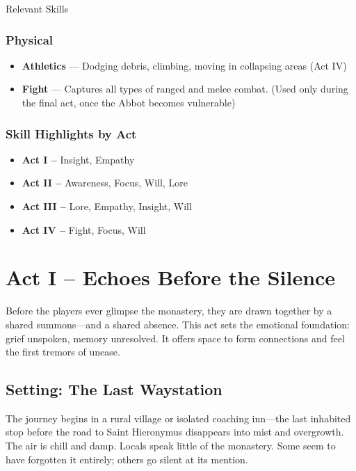 \documentclass[twocolumn,nodeprecatedcode,bg=print]{dndbook/dndbook}
\begin{document}
\begin{WyrdSidebar}{Relevant Skills}
    \subsubsection*{Physical}
    \begin{itemize}
        \item \textbf{Athletics} — Dodging debris, climbing, moving in collapsing areas (Act IV)
        \item \textbf{Fight} — Captures all types of ranged and melee combat. (Used only during the final act, once the Abbot becomes vulnerable)
    \end{itemize}
    
    \subsubsection*{Skill Highlights by Act}
    \begin{itemize}
        \item \textbf{Act I –} Insight, Empathy
        \item \textbf{Act II –} Awareness, Focus, Will, Lore
        \item \textbf{Act III –} Lore, Empathy, Insight, Will
        \item \textbf{Act IV –} Fight, Focus, Will
    \end{itemize}    
\end{WyrdSidebar}
    

\section*{Act I – Echoes Before the Silence}

Before the players ever glimpse the monastery, they are drawn together by a shared summons—and a shared absence. This act sets the emotional foundation: grief unspoken, memory unresolved. It offers space to form connections and feel the first tremors of unease.

\subsection*{Setting: The Last Waystation}

The journey begins in a rural village or isolated coaching inn—the last inhabited stop before the road to Saint Hieronymus disappears into mist and overgrowth. The air is chill and damp. Locals speak little of the monastery. Some seem to have forgotten it entirely; others go silent at its mention.
\end{document}
